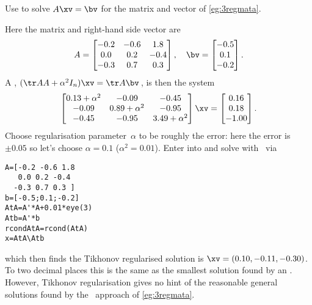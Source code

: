 \begin{example} \label{eg:}
Use  to solve \(A\xv=\bv\) for the matrix and vector of \autoref{eg:3regmata}.
\begin{solution} 
Here the matrix and right-hand side vector are
\begin{equation*}
A=\begin{bmatrix} -0.2&-0.6&1.8
\\ 0.0&0.2&-0.4
\\ -0.3&0.7&0.3 \end{bmatrix}, \quad
\bv=\begin{bmatrix} -0.5
\\ 0.1
\\ -0.2
 \end{bmatrix}.
\end{equation*}
A , \((\tr AA+\alpha^2I_n)\xv=\tr A\bv\)\,, is then the system
\begin{equation*}
\begin{bmatrix} 0.13+\alpha^2&-0.09&-0.45
\\-0.09&0.89+\alpha^2 &-0.95
\\-0.45&-0.95&3.49+\alpha^2\end{bmatrix}\xv
=\begin{bmatrix} 0.16\\0.18\\-1.00 \end{bmatrix}.
\end{equation*}
Choose regularisation parameter~\(\alpha\) to be roughly the error: here the error is~\(\pm0.05\) so let's choose \(\alpha=0.1\) (\(\alpha^2=0.01\)).
Enter into and solve with \script\ via
\begin{verbatim}
A=[-0.2 -0.6 1.8
   0.0 0.2 -0.4
  -0.3 0.7 0.3 ]
b=[-0.5;0.1;-0.2]
AtA=A'*A+0.01*eye(3)
Atb=A'*b
rcondAtA=rcond(AtA)
x=AtA\Atb
\end{verbatim}
\setbox\ajrqrbox\hbox{}%
\marginpar{\usebox{\ajrqrbox\\[2ex]}}%
which then finds the Tikhonov regularised solution is \(\xv=(0.10,-0.11,-0.30)\).
To two decimal places this is the same as the smallest solution found by an \svd.
However, Tikhonov regularisation gives no hint of the reasonable general solutions found by the \svd\ approach of \autoref{eg:3regmata}.
\end{solution}
\end{example}



